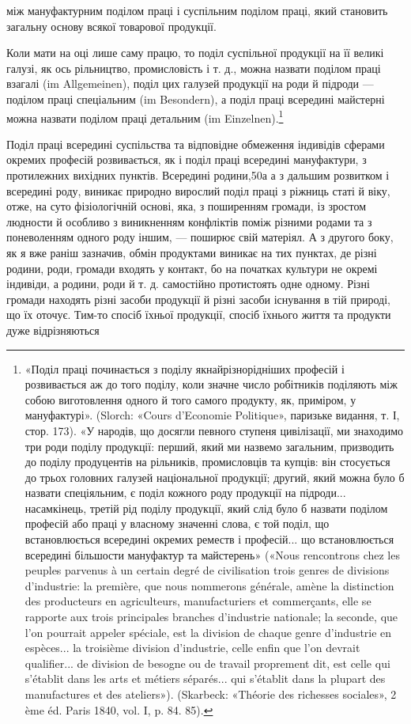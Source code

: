 \parcont{}  %
між мануфактурним поділом праці і суспільним поділом праці,
який становить загальну основу всякої товарової продукції.

Коли мати на оці лише саму працю, то поділ суспільної продукції
на її великі галузі, як ось рільництво, промисловість
і т. д., можна назвати поділом праці взагалі (im Allgemeinen),
поділ цих галузей продукції на роди й підроди — поділом праці
спеціальним (im Besondern), а поділ праці всередині майстерні
можна назвати поділом праці детальним (im Einzelnen).\footnote{
«Поділ праці починається з поділу якнайрізнорідніших професій
і розвивається аж до того поділу, коли значне число робітників поділяють
між собою виготовлення одного й того самого продукту, як, приміром,
у мануфактурі». (Slorch: «Cours d’Economie Politique», паризьке
видання, т. І, стор. 173). «У народів, що досягли певного ступеня цивілізації,
ми знаходимо три роди поділу продукції: перший, який ми назвемо
загальним, призводить до поділу продуцентів на рільників, промисловців
та купців: він стосується до трьох головних галузей національної
продукції; другий, який можна було б назвати спеціяльним, є поділ
кожного роду продукції на підроди... насамкінець, третій рід поділу
продукції, який слід було б назвати поділом професій або праці у власному
значенні слова, є той поділ, що встановлюється всередині окремих реместв
і професій... що встановлюється всередині більшости мануфактур
та майстерень» («Nous rencontrons chez les peuples parvenus à un certain
degré de civilisation trois genres de divisions d’industrie: la première,
que nous nommerons générale, amène la distinction des producteurs en
agriculteurs, manufacturiers et commerçants, elle se rapporte aux trois principales
branches d’industrie nationale; la seconde, que l’on pourrait appeler
spéciale, est la division de chaque genre d’industrie en espèces... la troisième
division d’industrie, celle enfin que l’on devrait qualifier... de division
de besogne ou de travail proprement dit, est celle qui s’établit dans les arts
et métiers séparés... qui s’établit dans la plupart des manufactures et des
ateliers»). (Skarbeck: «Théorie des richesses sociales», 2 ème éd. Paris
1840, vol. I, p. 84. 85).
}

Поділ праці всередині суспільства та відповідне обмеження
індивідів сферами окремих професій розвивається, як і поділ
праці всередині мануфактури, з протилежних вихідних пунктів.
Всередині родини,50а а з дальшим розвитком і всередині роду,
виникає природно вирослий поділ праці з ріжниць статі й віку,
отже, на суто фізіологічній основі, яка, з поширенням громади,
із зростом людности й особливо з виникненням конфліктів поміж
різними родами та з поневоленням одного роду іншим, — поширює
свій матеріял. А з другого боку, як я вже раніш зазначив,
обмін продуктами виникає на тих пунктах, де різні родини,
роди, громади входять у контакт, бо на початках культури не
окремі індивіди, а родини, роди й т. д. самостійно протистоять одне
одному. Різні громади находять різні засоби продукції й різні
засоби існування в тій природі, що їх оточує. Тим-то спосіб їхньої
продукції, спосіб їхнього життя та продукти дуже відрізняються

